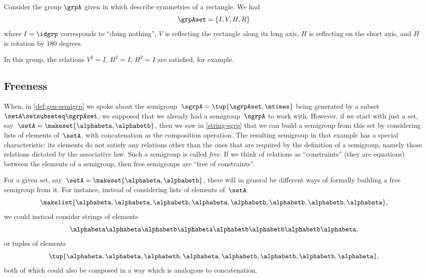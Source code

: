 \begin{example}
    Consider the group $\grpA$ given in \label{exa:grp-Klein4} which describe symmetries of a rectangle.
    We had
    \begin{equation}
        \grpAset = \{ I, V, H, R\}
    \end{equation}
    where $I = \idgrp$ corresponds to ``doing nothing'', $V$ is reflecting the rectangle along its long axis, $H$ is reflecting on the short axis, and $H$ is rotation by 180 degrees.

    In this group, the relations $V^2 = I$, $H^2 = I$, $H^2 = I$ are satisfied, for example.
\end{example}

\subsection{Freeness}

When, in \cref{def:gen-semigrp} we spoke about the semigroup~$\sgrpA = \tup{\sgrpAset, \mtimes}$  being generated by a subset~$\setA \setsubseteq \sgrpAset$, we supposed that we already had a semigroup~$\sgrpA$ to work with.
However, if we start with just a set, say~$\setA = \makeset{ \alphabeta, \alphabetb}$, then we saw in \cref{string-sgrp} that we can build a semigroup from this set by considering lists of elements of~$\setA$, with concatenation as the composition operation.
The resulting semigroup in that example has a special characteristic: its elements do not satisfy any relations other than the ones that are required by the definition of a semigroup, namely those relations dictated by the associative law.
Such a semigroup is called \emph{free}.
If we think of relations as ``constraints'' (they are equations) between the elements of a semigroup, then free semigroups are ``free of constraints''.

For a given set, say~$\setA = \makeset{ \alphabeta, \alphabetb}$, there will in general be different ways of formally building a free semigroup from it.
For instance, instead of considering lists of elements of~$\setA$
\begin{equation}
    \makelist{\alphabeta,\alphabeta, \alphabetb, \alphabeta, \alphabetb, \alphabetb, \alphabetb, \alphabeta},
\end{equation}
we could instead consider strings of elements
\begin{equation}
    \alphabeta\alphabeta \alphabetb \alphabeta \alphabetb \alphabetb \alphabetb \alphabeta,
\end{equation}
or tuples of elements
\begin{equation}
    \tup{ \alphabeta, \alphabeta,  \alphabetb,  \alphabeta,  \alphabetb,  \alphabetb,  \alphabetb,  \alphabeta},
\end{equation}
both of which could also be composed in a way which is analogous to concatenation.

